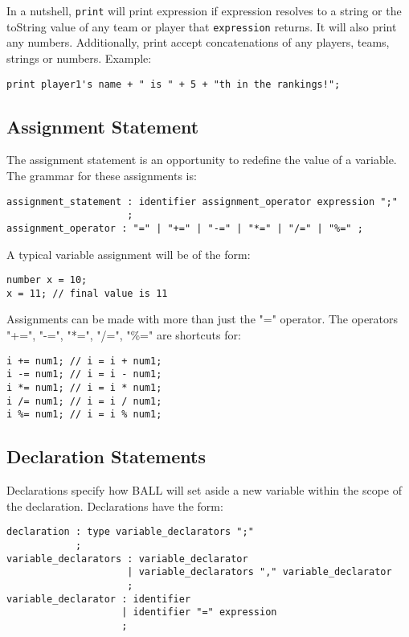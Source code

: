 In a nutshell, \texttt{print} will print expression if expression
resolves to a string or the toString value of any team or player that
\texttt{expression} returns. It will also print any
numbers. Additionally, print accept concatenations of any players,
teams, strings or numbers. Example:

\begin{verbatim}
print player1's name + " is " + 5 + "th in the rankings!";
\end{verbatim}

\subsection{Assignment Statement}
The assignment statement is an opportunity to redefine the value of a
variable. The grammar for these assignments is:

\begin{verbatim}
assignment_statement : identifier assignment_operator expression ";"
                     ;
assignment_operator : "=" | "+=" | "-=" | "*=" | "/=" | "%=" ;
\end{verbatim}

A typical variable assignment will be of the form:

\begin{verbatim}
number x = 10;
x = 11; // final value is 11
\end{verbatim}

Assignments can be made with more than just the "=" operator. The
operators "+=", "-=", "*=", "/=", "\%=" are shortcuts for:

\begin{verbatim}
i += num1; // i = i + num1;
i -= num1; // i = i - num1;
i *= num1; // i = i * num1;
i /= num1; // i = i / num1;
i %= num1; // i = i % num1;
\end{verbatim}
 
\subsection{Declaration Statements}

Declarations specify how BALL will set aside a new variable within the
scope of the declaration. Declarations have the form:

\begin{verbatim}
declaration : type variable_declarators ";"
            ;
variable_declarators : variable_declarator
                     | variable_declarators "," variable_declarator
                     ;
variable_declarator : identifier
                    | identifier "=" expression
                    ;
\end{verbatim}

